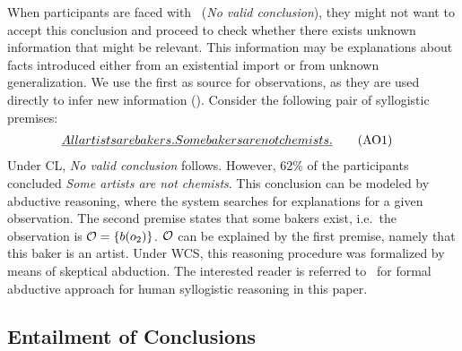 \documentclass[12pt]{article}
\begin{document}
When participants are faced with \NVC\ (\textit{No valid conclusion}), they might not want to accept this conclusion and proceed to check whether there exists unknown information that might be relevant. This information may be explanations about
facts introduced either from an existential import or from unknown generalization. 
We use the first as source for observations, as they are used directly to infer new information  (\abduction). Consider the following pair of syllogistic premises: 
\begin{align}
 \emph{All artists are bakers. } & \emph{Some bakers are not chemists.} \tag{AO1} 
\end{align}
Under CL, \textit{No valid conclusion} follows. However, 62\;\% of the participants concluded \textit{Some artists are not chemists}.
This conclusion can be modeled by abductive reasoning, where the system searches for explanations
for a given observation. The second premise states that some bakers exist, i.e.\ the observation is ${\cal O} = \{b(o_2) \}$. ${\cal O}$ can be explained by the first premise, namely that
this baker is an artist. Under WCS, this reasoning procedure was formalized by means of skeptical abduction.
The interested reader is referred to~\cite{cogsci:2017} for 
formal abductive approach for human syllogistic reasoning in this paper.



\subsection{Entailment of Conclusions}\label{sect:entail}
\end{document}
